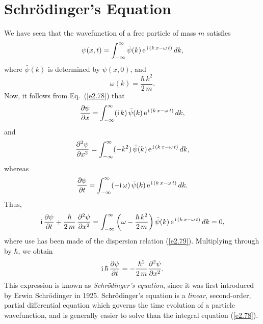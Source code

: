 \section{Schr\"{o}dinger's Equation}\label{sch}
We have seen that the  wavefunction  of a free particle of mass $m$ satisfies
\begin{equation}\label{e2.78}
\psi(x,t)=\int_{-\infty}^{\infty}\bar{\psi}(k)\,{\rm e}^{\,{\rm i}\,(k\,x-\omega\,t)}\,dk,
\end{equation}
where $\bar{\psi}(k)$ is determined by $\psi(x,0)$, and
\begin{equation}\label{e2.79}
\omega(k) = \frac{\hbar\,k^2}{2\,m}.
\end{equation}
Now, it follows from Eq.~(\ref{e2.78}) that
\begin{equation}\label{e2.80}
\frac{\partial\psi}{\partial x} = \int_{-\infty}^{\infty}({\rm i}\,k)\,\bar{\psi}(k)\,{\rm e}^{\,{\rm i}\,(k\,x-\omega\,t)}\,dk,
\end{equation}
and
\begin{equation}
\frac{\partial^2\psi}{\partial x^2} = \int_{-\infty}^{\infty}(-k^2)\,\bar{\psi}(k)\,{\rm e}^{\,{\rm i}\,(k\,x-\omega\,t)}\,dk,
\end{equation}
whereas
\begin{equation}
\frac{\partial \psi}{\partial t} = \int_{-\infty}^{\infty}(-{\rm i}\,\omega)\,\bar{\psi}(k)\,{\rm e}^{\,{\rm i}\,(k\,x-\omega\,t)}\,dk.
\end{equation}
Thus,
\begin{equation}
{\rm i}\,\frac{\partial\psi}{\partial t} +\frac{\hbar}{2\,m}\,\frac{\partial^2\psi}{\partial x^2} =
\int_{-\infty}^{\infty}\left(\omega-\frac{\hbar\,k^2}{2\,m}\right)\bar{\psi}(k)\,{\rm e}^{\,{\rm i}\,(k\,x-\omega\,t)}\,dk= 0,
\end{equation}
where use has been made of the dispersion relation (\ref{e2.79}).
Multiplying through by $\hbar$, we obtain
\begin{equation}\label{e2.84}
{\rm i}\,\hbar\,\frac{\partial\psi}{\partial t} = -\frac{\hbar^2}{2\,m}\frac{\partial^2\psi}{\partial x^2}.
\end{equation}
This expression is known as {\em Schr\"{o}dinger's equation}, since it was first
introduced by Erwin Schr\"{o}dinger in 1925. Schr\"{o}dinger's equation
is a {\em linear}, second-order, partial differential equation which governs the time evolution of a particle
wavefunction, and is generally easier to solve than the integral equation
(\ref{e2.78}).

